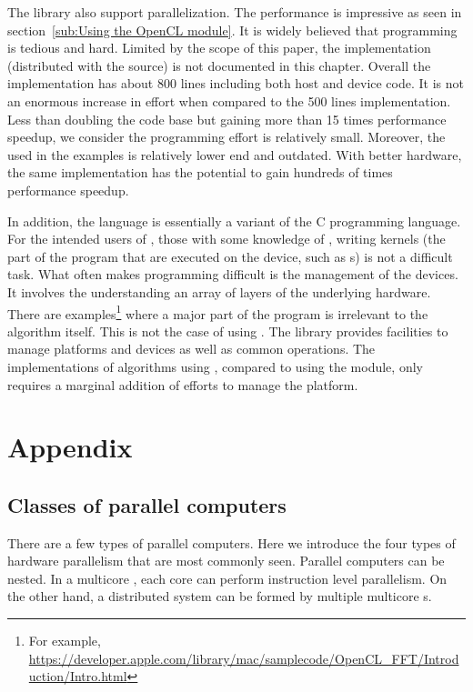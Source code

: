 The library also support \opencl parallelization. The performance is
impressive as seen in section~\ref{sub:Using the OpenCL module}. It is widely
believed that \opencl programming is tedious and hard. Limited by the scope of
this paper, the \opencl implementation (distributed with the \vsmc source) is
not documented in this chapter. Overall the \opencl implementation has about
800 lines including both host and device code. It is not an enormous increase
in effort when compared to the 500 lines \smp implementation. Less than
doubling the code base but gaining more than 15 times performance speedup, we
consider the programming effort is relatively small. Moreover, the \gpu used
in the examples is relatively lower end and outdated. With better hardware,
the same implementation has the potential to gain hundreds of times
performance speedup.

In addition, the \opencl language is essentially a variant of the C
programming language. For the intended users of \vsmc, those with some
knowledge of \cpp, writing \opencl kernels (the part of the program that are
executed on the device, such as \gpu{}s) is not a difficult task. What often
makes \opencl programming difficult is the management of the devices. It
involves the understanding an array of layers of the underlying hardware.
There are examples\footnote{For example,
  \url{https://developer.apple.com/library/mac/samplecode/OpenCL_FFT/Introduction/Intro.html}}
where a major part of the program is irrelevant to the algorithm itself. This
is not the case of using \vsmc. The library provides facilities to manage
\opencl platforms and devices as well as common operations. The
implementations of \smc algorithms using \opencl, compared to using the \smp
module, only requires a marginal addition of efforts to manage the \opencl
platform.

\section{Appendix}
\label{sec:vSMC Appendix}

\subsection{Classes of parallel computers}
\label{sub:Classes of parallel computers}

There are a few types of parallel computers. Here we introduce the four types
of hardware parallelism that are most commonly seen. Parallel computers can be
nested. In a multicore \cpu, each core can perform instruction level
parallelism. On the other hand, a distributed system can be formed by multiple
multicore \cpu{}s.

